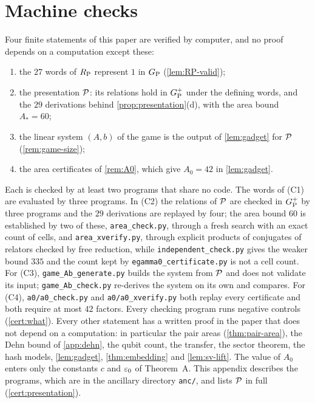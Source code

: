 \section{Machine checks}\label{app:cert}

Four finite statements of this paper are verified by computer, and no proof depends on a computation except these:
\begin{enumerate}[label=(C\arabic*),itemsep=1pt]
\item the $27$ words of $R_{\mathrm P}$ represent $1$ in $G_{\mathrm P}$ (\cref{lem:RP-valid});
\item the presentation $\mathcal P$: its relations hold in $G_{\mathrm P}^{+}$ under the defining words, and the $29$ derivations behind
\cref{prop:presentation}(d), with the area bound $A_*=60$;
\item the linear system $(A,b)$ of the game is the output of \cref{lem:gadget} for $\mathcal P$ (\cref{rem:game-size});
\item the area certificates of \cref{rem:A0}, which give $A_0=42$ in \cref{lem:gadget}.
\end{enumerate}
Each is checked by at least two programs that share no code. The words of (C1) are evaluated by three programs. In (C2) the relations of
$\mathcal P$ are checked in $G_{\mathrm P}^{+}$ by three programs and the $29$ derivations are replayed by four; the area bound $60$ is established by two of
these, \texttt{area\_check.py}, through a fresh search with an exact count of cells, and \texttt{area\_xverify.py}, through explicit products
of conjugates of relators checked by free reduction, while \texttt{independent\_check.py} gives the weaker bound $335$ and the count kept
by \texttt{egamma0\_certificate.py} is not a cell count. For (C3), \texttt{game\_Ab\_generate.py} builds the system from $\mathcal P$ and does not validate
its input; \texttt{game\_Ab\_check.py} re-derives the system on its own and compares. For (C4), \texttt{a0/a0\_check.py} and
\texttt{a0/a0\_xverify.py} both replay every certificate and both require at most $42$ factors. Every checking program runs negative controls
(\cref{cert:what}). Every other statement has a written proof in the paper that does not depend on a computation: in particular the pair areas (\cref{thm:pair-area}), the Dehn bound of
\cref{app:dehn}, the qubit count, the transfer, the sector theorem, the hash models, \cref{lem:gadget}, \cref{thm:embedding} and
\cref{lem:sv-lift}. The value of $A_0$ enters only the constants $c$ and $\varepsilon_0$ of Theorem~A. This appendix describes the programs, which are in the ancillary directory \texttt{anc/}, and lists $\mathcal P$ in full (\cref{cert:presentation}).

